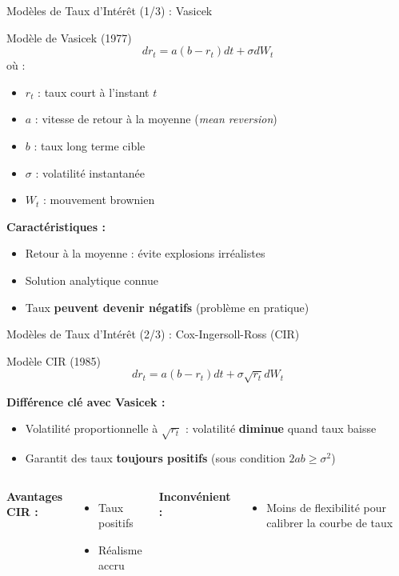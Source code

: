 \documentclass[10pt,aspectratio=169]{beamer}
\begin{document}
\begin{frame}{Modèles de Taux d'Intérêt (1/3) : Vasicek}
\begin{block}{Modèle de Vasicek (1977)}
\[
dr_t = a(b - r_t)dt + \sigma dW_t
\]
où :
\begin{itemize}
    \item $r_t$ : taux court à l'instant $t$
    \item $a$ : vitesse de retour à la moyenne (\textit{mean reversion})
    \item $b$ : taux long terme cible
    \item $\sigma$ : volatilité instantanée
    \item $W_t$ : mouvement brownien
\end{itemize}
\end{block}

\textbf{Caractéristiques :}
\begin{itemize}
    \item[\checkmark] Retour à la moyenne : évite explosions irréalistes
    \item[\checkmark] Solution analytique connue
    \item[\texttimes] Taux \textbf{peuvent devenir négatifs} (problème en pratique)
\end{itemize}
\end{frame}

\begin{frame}{Modèles de Taux d'Intérêt (2/3) : Cox-Ingersoll-Ross (CIR)}
\begin{block}{Modèle CIR (1985)}
\[
dr_t = a(b - r_t)dt + \sigma \sqrt{r_t} dW_t
\]
\end{block}

\textbf{Différence clé avec Vasicek :}
\begin{itemize}
    \item Volatilité proportionnelle à $\sqrt{r_t}$ : volatilité \textbf{diminue} quand taux baisse
    \item Garantit des taux \textbf{toujours positifs} (sous condition $2ab \geq \sigma^2$)
\end{itemize}

\vspace{0.3cm}
\begin{columns}
\textbf{Avantages CIR :}
\begin{itemize}
    \item[\checkmark] Taux positifs
    \item[\checkmark] Réalisme accru
\end{itemize}

\textbf{Inconvénient :}
\begin{itemize}
    \item[\texttimes] Moins de flexibilité pour calibrer la courbe de taux
\end{itemize}
\end{columns}
\end{frame}
\end{document}
